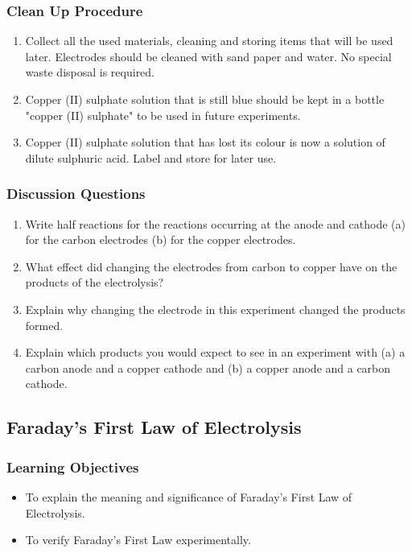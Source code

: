 \subsubsection*{Clean Up Procedure}
\begin{enumerate}
\item{Collect all the used materials, cleaning and storing items that will be used later. Electrodes should be cleaned with sand paper and water. No special waste disposal is required.}
\item{Copper (II) sulphate solution that is still blue should be kept in a bottle "copper (II) sulphate" to be used in future experiments.}
\item{Copper (II) sulphate solution that has lost its colour is now a solution of dilute sulphuric acid. Label and store for later use.}
\end{enumerate}

\subsubsection*{Discussion Questions}
\begin{enumerate}
\item{Write half reactions for the reactions occurring at the anode and cathode (a) for the carbon electrodes (b) for the copper electrodes.}
\item{What effect did changing the electrodes from carbon to copper have on the products of the electrolysis?}
\item{Explain why changing the electrode in this experiment changed the products formed.}
\item{Explain which products you would expect to see in an experiment with (a) a carbon anode and a copper cathode and (b) a copper anode and a carbon cathode.}
\end{enumerate}

\subsection{Faraday's First Law of Electrolysis}

\subsubsection*{Learning Objectives}
\begin{itemize}
\item{To explain the meaning and significance of Faraday's First Law of Electrolysis.}
\item{To verify Faraday's First Law experimentally.}
\end{itemize}

